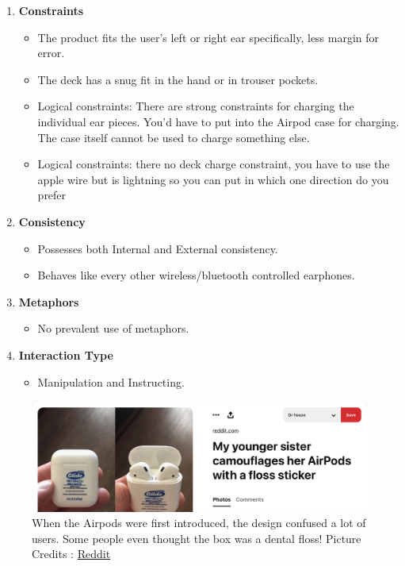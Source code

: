 \documentclass[10pt]{scrartcl}
\begin{document}
\begin{enumerate}
\begin{itemize}
			
		\end{itemize}
		
		\item \textbf{Constraints} 
		\begin{itemize}
\item The product fits the user’s left or right ear specifically, less margin for error. 
\item The deck has a snug fit in the hand or in trouser pockets.
\item Logical constraints: There are strong constraints for charging the individual ear pieces. You’d have to put into the Airpod case for charging. The case itself cannot be used to charge something else.
\item Logical constraints: there no deck charge constraint, you have to use the apple wire but is lightning so you can put in which one direction do you prefer

		\end{itemize}
		
		\item \textbf{Consistency} 
		\begin{itemize}
			\item Possesses both Internal and External consistency.
			\item Behaves like every other wireless/bluetooth controlled earphones.
		\end{itemize}
		
		\item \textbf{Metaphors} 	
		\begin{itemize}
			\item No prevalent use of metaphors.
		\end{itemize}
		
		\item \textbf{Interaction Type}
		\begin{itemize}
\item Manipulation and Instructing.
\end{itemize}
\end{enumerate}


\begin{figure}
	\centering
	\includegraphics[width=0.5\linewidth]{floss}
	\caption{When the Airpods were first introduced, the design confused a lot of users. Some people even thought the box was a dental floss! Picture Credits :	\href{https://www.reddit.com/r/iphone/comments/bf5x3z/my_younger_sister_camouflages_her_airpods_with_a/?utm_source=ifttt}{Reddit}}
	\label{fig:floss}
\end{figure}
\end{document}
